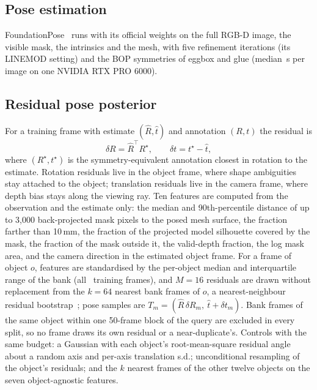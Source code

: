 \subsection{Pose estimation}
FoundationPose~\cite{wen2024foundationpose} runs with its official weights on the full RGB-D image, the visible mask, the intrinsics and the mesh, with five refinement iterations (its LINEMOD setting) and the BOP symmetries of eggbox and glue (median \FpSec\,s per image on one NVIDIA RTX PRO 6000).

\subsection{Residual pose posterior}
For a training frame with estimate $(\hat R,\hat t)$ and annotation $(R,t)$ the residual is
\begin{equation}
\delta R=\hat R^{\top}R^{\star},\qquad \delta t=t^{\star}-\hat t,
\end{equation}
where $(R^{\star},t^{\star})$ is the symmetry-equivalent annotation closest in rotation to the estimate. Rotation residuals live in the object frame, where shape ambiguities stay attached to the object; translation residuals live in the camera frame, where depth bias stays along the viewing ray. Ten features are computed from the observation and the estimate only: the median and 90th-percentile distance of up to 3,000 back-projected mask pixels to the posed mesh surface, the fraction farther than 10\,mm, the fraction of the projected model silhouette covered by the mask, the fraction of the mask outside it, the valid-depth fraction, the log mask area, and the camera direction in the estimated object frame. For a frame of object $o$, features are standardised by the per-object median and interquartile range of the bank (all \NTrain\ training frames), and $M=16$ residuals are drawn without replacement from the $k=64$ nearest bank frames of $o$, a nearest-neighbour residual bootstrap~\cite{efron1979bootstrap,lall1996nnboot}; pose samples are $T_m=(\hat R\,\delta R_m,\ \hat t+\delta t_m)$. Bank frames of the same object within one 50-frame block of the query are excluded in every split, so no frame draws its own residual or a near-duplicate's. Controls with the same budget: a Gaussian with each object's root-mean-square residual angle about a random axis and per-axis translation s.d.; unconditional resampling of the object's residuals; and the $k$ nearest frames of the other twelve objects on the seven object-agnostic features.

